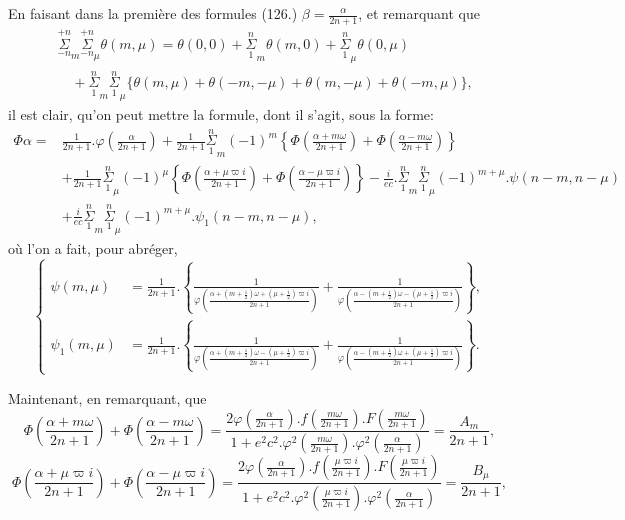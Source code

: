 \documentclass{article}
\begin{document}
En faisant dans la première des formules (126.) $\beta=\frac{\alpha}{2n+1}$, et remarquant que
\[ \begin{aligned}
&\overset{+n}{\underset{-n}{\Sigma}}_{m}\overset{+n}{\underset{-n}{\Sigma}}_{\mu}\theta(m,\mu)=\theta(0,0)+\overset{n}{\underset{1}{\Sigma}}_{m}\theta(m,0)+\overset{n}{\underset{1}{\Sigma}}_{\mu}\theta(0,\mu)\\
&\quad+\overset{n}{\underset{1}{\Sigma}}_{m}\overset{n}{\underset{1}{\Sigma}}_{\mu}\{\theta(m,\mu)+\theta(-m,-\mu)+\theta(m,-\mu)+\theta(-m,\mu)\},
\end{aligned} \tag{131.} \]
il est clair, qu'on peut mettre la formule, dont il s'agit, sous la forme:
\[ \begin{aligned}
\Phi\alpha={}&\frac{1}{2n+1}.\varphi\left(\frac{\alpha}{2n+1}\right)+\frac{1}{2n+1}\overset{n}{\underset{1}{\Sigma}}_{m}(-1)^{m}\left\{\Phi\left(\frac{\alpha+m\omega}{2n+1}\right)+\Phi\left(\frac{\alpha-m\omega}{2n+1}\right)\right\}\\
&+\frac{1}{2n+1}\overset{n}{\underset{1}{\Sigma}}_{\mu}(-1)^{\mu}\left\{\Phi\left(\frac{\alpha+\mu\varpi i}{2n+1}\right)+\Phi\left(\frac{\alpha-\mu\varpi i}{2n+1}\right)\right\}-\frac{i}{ec}.\overset{n}{\underset{1}{\Sigma}}_{m}\overset{n}{\underset{1}{\Sigma}}_{\mu}(-1)^{m+\mu}.\psi(n-m,n-\mu)\\
&+\frac{i}{ec}\overset{n}{\underset{1}{\Sigma}}_{m}\overset{n}{\underset{1}{\Sigma}}_{\mu}(-1)^{m+\mu}.\psi_{1}(n-m,n-\mu),
\end{aligned} \tag{132.} \]
où l'on a fait, pour abréger,
\[ \left\{\begin{aligned}
\psi(m,\mu)&=\frac{1}{2n+1}.\left\{\frac{1}{\varphi\left(\frac{\alpha+(m+\tfrac{1}{2})\omega+(\mu+\tfrac{1}{2})\varpi i}{2n+1}\right)}+\frac{1}{\varphi\left(\frac{\alpha-(m+\tfrac{1}{2})\omega-(\mu+\tfrac{1}{2})\varpi i}{2n+1}\right)}\right\},\\
\psi_{1}(m,\mu)&=\frac{1}{2n+1}.\left\{\frac{1}{\varphi\left(\frac{\alpha+(m+\tfrac{1}{2})\omega-(\mu+\tfrac{1}{2})\varpi i}{2n+1}\right)}+\frac{1}{\varphi\left(\frac{\alpha-(m+\tfrac{1}{2})\omega+(\mu+\tfrac{1}{2})\varpi i}{2n+1}\right)}\right\}.
\end{aligned}\right. \tag{133.} \]

Maintenant, en remarquant, que
\[ \Phi\left(\frac{\alpha+m\omega}{2n+1}\right)+\Phi\left(\frac{\alpha-m\omega}{2n+1}\right)=\frac{2\varphi\left(\frac{\alpha}{2n+1}\right).f\left(\frac{m\omega}{2n+1}\right).F\left(\frac{m\omega}{2n+1}\right)}{1+e^{2}c^{2}.\varphi^{2}\left(\frac{m\omega}{2n+1}\right).\varphi^{2}\left(\frac{\alpha}{2n+1}\right)}=\frac{A_{m}}{2n+1}, \]
\[ \Phi\left(\frac{\alpha+\mu\varpi i}{2n+1}\right)+\Phi\left(\frac{\alpha-\mu\varpi i}{2n+1}\right)=\frac{2\varphi\left(\frac{\alpha}{2n+1}\right).f\left(\frac{\mu\varpi i}{2n+1}\right).F\left(\frac{\mu\varpi i}{2n+1}\right)}{1+e^{2}c^{2}.\varphi^{2}\left(\frac{\mu\varpi i}{2n+1}\right).\varphi^{2}\left(\frac{\alpha}{2n+1}\right)}=\frac{B_{\mu}}{2n+1}, \]
\end{document}
